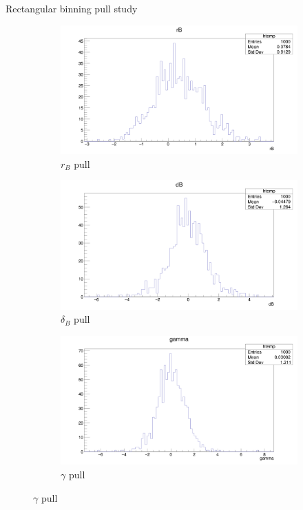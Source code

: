 \documentclass{beamer}
\begin{document}
\begin{frame}{Rectangular binning pull study}
  \begin{figure}
    \centering
    \vspace{-0.2cm}
    \begin{subfigure}{0.5\textwidth}
      \includegraphics[width = 1.0\textwidth]{SophisticatedPulls/rB1K1K.png}
      \caption{$r_B$ pull}
    \end{subfigure}%
    \begin{subfigure}{0.5\textwidth}
      \includegraphics[width = 1.0\textwidth]{SophisticatedPulls/dB1K1K.png}
      \caption{$\delta_B$ pull}
    \end{subfigure}
    \begin{subfigure}{0.5\textwidth}
      \includegraphics[width = 1.0\textwidth]{SophisticatedPulls/gamma1K1K.png}
      \caption{$\gamma$ pull}
    \end{subfigure}
  \end{figure}
\end{frame}
\end{document}
